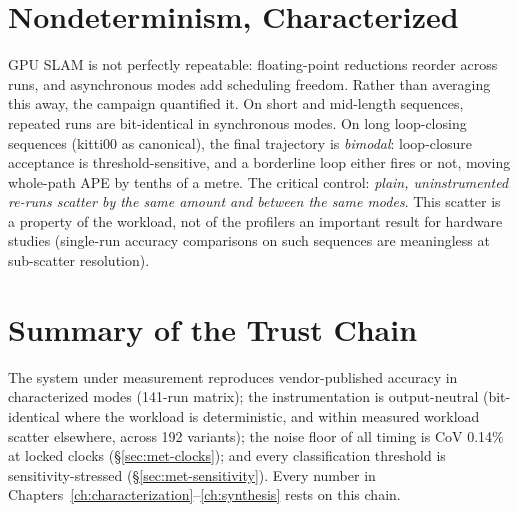 \section{Nondeterminism, Characterized}
\label{sec:val-nondeterminism}

GPU SLAM is not perfectly repeatable: floating-point reductions reorder across runs, and asynchronous modes add scheduling freedom. Rather than averaging this away, the campaign quantified it. On short and mid-length sequences, repeated runs are bit-identical in synchronous modes. On long loop-closing sequences (kitti00 as canonical), the final trajectory is \emph{bimodal}: loop-closure acceptance is threshold-sensitive, and a borderline loop either fires or not, moving whole-path APE by tenths of a metre. The critical control: \emph{plain, uninstrumented re-runs scatter by the same amount and between the same modes}. This scatter is a property of the workload, not of the profilers an important result for hardware studies (single-run accuracy comparisons on such sequences are meaningless at sub-scatter resolution).

\section{Summary of the Trust Chain}

The system under measurement reproduces vendor-published accuracy in characterized modes (141-run matrix); the instrumentation is output-neutral (bit-identical where the workload is deterministic, and within measured workload scatter elsewhere, across 192 variants); the noise floor of all timing is CoV 0.14\% at locked clocks (\S\ref{sec:met-clocks}); and every classification threshold is sensitivity-stressed (\S\ref{sec:met-sensitivity}). Every number in Chapters~\ref{ch:characterization}--\ref{ch:synthesis} rests on this chain.